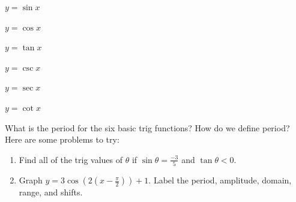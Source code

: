 \documentclass[11pt]{article}
\begin{document}
    \begin{center}
        \begin{minipage}{0.32\textwidth}
            \centering $\displaystyle y = \sin x$\\[1ex]
            \smallgraph
        \end{minipage}
        \begin{minipage}{0.32\textwidth}
            \centering $\displaystyle y = \cos x$\\[1ex]
            \smallgraph
        \end{minipage}
        \begin{minipage}{0.32\textwidth}
            \centering $\displaystyle y = \tan x$\\[1ex]
            \smallgraph
        \end{minipage}

        \vspace{1ex}

        \begin{minipage}{0.32\textwidth}
            \centering $\displaystyle y = \csc x$\\[1ex]
            \smallgraph
        \end{minipage}
        \begin{minipage}{0.32\textwidth}
            \centering $\displaystyle y = \sec x$\\[1ex]
            \smallgraph
        \end{minipage}
        \begin{minipage}{0.32\textwidth}
            \centering $\displaystyle y = \cot x$\\[1ex]
            \smallgraph
        \end{minipage}
    \end{center}

    \vspace{1ex}

    \noindent What is the period for the six basic trig functions? How do we define period?\\[2ex]

    \noindent Here are some problems to try:

    \begin{enumerate}
        \item Find all of the trig values of $\displaystyle \theta$ if $\displaystyle \sin \theta = \frac{-3}{5}$ and $\displaystyle \tan \theta < 0$.\\[2ex]

        \item Graph $\displaystyle y = 3\cos\!\left(2\left(x-\frac{\pi}{2}\right)\right) + 1$. Label the period, amplitude, domain, range, and shifts.

        \emptygraph
    \end{enumerate}
\end{document}
